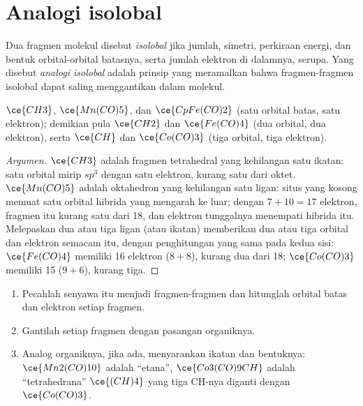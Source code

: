 \section{Analogi isolobal}

\begin{definition}\label{def:b3:organometallic-bonding:isolobal}
Dua fragmen molekul disebut \emph{isolobal} jika
jumlah, simetri, perkiraan energi, dan bentuk orbital-orbital batasnya, serta
jumlah elektron di dalamnya, serupa. Yang disebut \emph{analogi
isolobal} adalah prinsip yang meramalkan bahwa fragmen-fragmen isolobal dapat saling
menggantikan dalam molekul.
\end{definition}

\begin{proposition}\label{prop:b3:organometallic-bonding:isolobal}
$\ce{CH3}$, $\ce{Mn(CO)5}$, dan $\ce{CpFe(CO)2}$  (satu orbital batas, satu elektron);
demikian pula $\ce{CH2}$ dan $\ce{Fe(CO)4}$ (dua orbital, dua elektron), serta $\ce{CH}$ dan $\ce{Co(CO)3}$ (tiga orbital,
tiga elektron).
\end{proposition}

\begin{proof}[Argumen]
$\ce{CH3}$ adalah fragmen tetrahedral yang kehilangan satu ikatan: satu orbital mirip $sp^3$ dengan satu
elektron, kurang satu dari oktet. $\ce{Mn(CO)5}$ adalah oktahedron yang kehilangan satu ligan:
situs yang kosong memuat satu orbital hibrida yang mengarah ke luar; dengan $7 + 10 = 17$ elektron, fragmen itu kurang satu
dari 18, dan elektron tunggalnya menempati hibrida itu. Melepaskan dua atau tiga
ligan (atau ikatan) memberikan dua atau tiga orbital dan elektron semacam itu, dengan
penghitungan yang sama pada kedua sisi: $\ce{Fe(CO)4}$ memiliki 16 elektron ($8 + 8$), kurang dua dari 18;
$\ce{Co(CO)3}$ memiliki 15 ($9 + 6$), kurang tiga.
\end{proof}

\begin{method}\label{met:b3:organometallic-bonding:isolobal}
\begin{enumerate}
  \item Pecahlah senyawa itu menjadi fragmen-fragmen dan hitunglah orbital batas
        dan elektron setiap fragmen.
  \item Gantilah setiap fragmen dengan pasangan  organiknya.
  \item Analog organiknya, jika ada, menyarankan ikatan dan bentuknya:
        $\ce{Mn2(CO)10}$ adalah ``etana'', $\ce{Co3(CO)9CH}$ adalah ``tetrahedrana'' $\ce{(CH)4}$ yang tiga CH-nya
        diganti dengan $\ce{Co(CO)3}$.
\end{enumerate}
\end{method}

